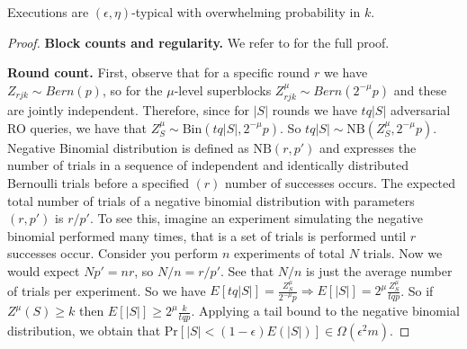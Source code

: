 \begin{thm}[Typicality]
	Executions are $(\epsilon, \eta)$-typical with overwhelming probability in $k$.
\end{thm}
\begin{proof}
	\textbf{Block counts and regularity.} We refer to \cite{backbone} for
	the full proof.

	\textbf{Round count.} First, observe that for a specific round $r$ we have $Z_{rjk}
	\sim Bern(p)$, so for the $\mu$-level superblocks $Z_{rjk}^\mu \sim Bern(2^{-\mu}p)$
	and these are jointly independent. Therefore, since for $\vert S \vert$ rounds we
	have $tq\vert S \vert$ adversarial RO queries, we have that $Z_S^\mu \sim
	\text{Bin}(tq \vert S \vert, 2^{-\mu}p)$. So $tq \vert S \vert \sim
	\text{NB}(Z_S^\mu, 2^{-\mu}p)$. Negative Binomial distribution is defined
	as $\text{NB}(r, p')$ and expresses the number of trials in a sequence of
	independent and identically distributed Bernoulli trials before a specified
	$(r)$ number of successes occurs. The expected total number of trials of a
	negative binomial distribution with parameters $(r, p')$ is $r/p'$. To see
	this, imagine an experiment simulating the negative binomial performed many
	times, that is a set of trials is performed until $r$ successes occur. Consider
	you perform $n$ experiments of total $N$ trials. Now we would expect $Np' = nr$,
	so $N/n = r/p'$. See that $N/n$ is just the average number of trials per
	experiment. So we have $E[tq \vert S \vert] = \frac{Z^\mu_S}{2^{-\mu}p}
	\Rightarrow E[\vert S \vert] = 2^\mu \frac{Z^\mu_S}{tqp}$. So if $Z^\mu(S) \geq k$
	then $E[\vert S \vert] \geq 2^\mu \frac{k}{tqp}$. Applying a tail bound to the
	negative binomial distribution, we obtain that $\text{Pr}[\vert S \vert < (1 -
	\epsilon)E(\vert S \vert)] \in \Omega(\epsilon^{2}m)$.
\end{proof}

